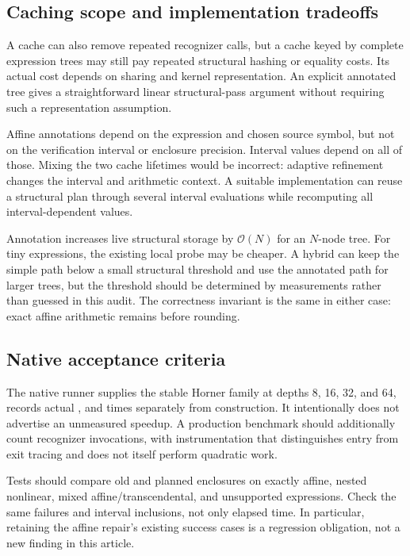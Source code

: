 \documentclass[11pt,a4paper]{article}
\newcommand{\code}[1]{\texttt{\detokenize{#1}}}
\newcommand{\OO}{\mathcal O}
\begin{document}
\subsection{Caching scope and implementation tradeoffs}
A cache can also remove repeated recognizer calls, but a cache keyed by complete
expression trees may still pay repeated structural hashing or equality costs.
Its actual cost depends on sharing and kernel representation. An explicit
annotated tree gives a straightforward linear structural-pass argument without
requiring such a representation assumption.

Affine annotations depend on the expression and chosen source symbol, but not
on the verification interval or enclosure precision. Interval values depend on
all of those. Mixing the two cache lifetimes would be incorrect: adaptive
refinement changes the interval and arithmetic context. A suitable implementation
can reuse a structural plan through several interval evaluations while recomputing
all interval-dependent values.

Annotation increases live structural storage by $\OO(N)$ for an $N$-node tree.
For tiny expressions, the existing local probe may be cheaper. A hybrid can keep
the simple path below a small structural threshold and use the annotated path
for larger trees, but the threshold should be determined by measurements rather
than guessed in this audit. The correctness invariant is the same in either
case: exact affine arithmetic remains before rounding.

\subsection{Native acceptance criteria}
The native runner supplies the stable Horner family at depths 8, 16, 32, and 64,
records actual \code{LeafCount}, and times \code{certEnclose} separately from
construction. It intentionally does not advertise an unmeasured speedup. A
production benchmark should additionally count recognizer invocations, with
instrumentation that distinguishes entry from exit tracing and does not itself
perform quadratic work.

Tests should compare old and planned enclosures on exactly affine, nested
nonlinear, mixed affine/transcendental, and unsupported expressions. Check the
same failures and interval inclusions, not only elapsed time. In particular,
retaining the affine repair's existing success cases is a regression obligation,
not a new finding in this article.
\end{document}
